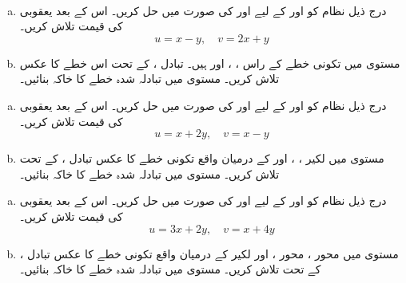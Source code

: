 \\
\begin{enumerate}[a.]
\item
درج ذیل نظام کو  اور  کے لیے  اور  کی صورت میں حل کریں۔ اس کے بعد یعقوبی  کی قیمت تلاش کریں۔
\[u=x-y,\quad v=2x+y\]
\item
مستوی  میں   تکونی خطے کے راس ،  ، اور  ہیں۔  تبادل ،  کے تحت  اس خطے    کا عکس    تلاش کریں۔ مستوی  میں تبادلہ شدہ  خطے کا خاکہ بنائیں۔
\end{enumerate}
\begin{enumerate}[a.]
\item
درج ذیل نظام کو  اور  کے لیے  اور  کی صورت میں حل کریں۔ اس کے بعد یعقوبی  کی قیمت تلاش کریں۔
\[u=x+2y,\quad v=x-y\]
\item
مستوی  میں  لکیر  ،  ، اور  کے درمیان واقع   تکونی خطے   کا عکس تبادل ،   کے تحت  تلاش کریں۔ مستوی  میں تبادلہ  شدہ  خطے کا خاکہ بنائیں۔

\end{enumerate}
\begin{enumerate}[a.]
\item
درج ذیل نظام کو  اور  کے لیے  اور  کی صورت میں حل کریں۔ اس کے بعد یعقوبی  کی قیمت تلاش کریں۔
\[u=3x+2y,\quad v=x+4y\]
\item
مستوی  میں محور   ، محور  ،  اور لکیر   کے درمیان واقع تکونی خطے   کا عکس تبادل ،   کے تحت تلاش کریں۔ مستوی  میں تبادلہ  شدہ  خطے کا خاکہ بنائیں۔
\end{enumerate}
